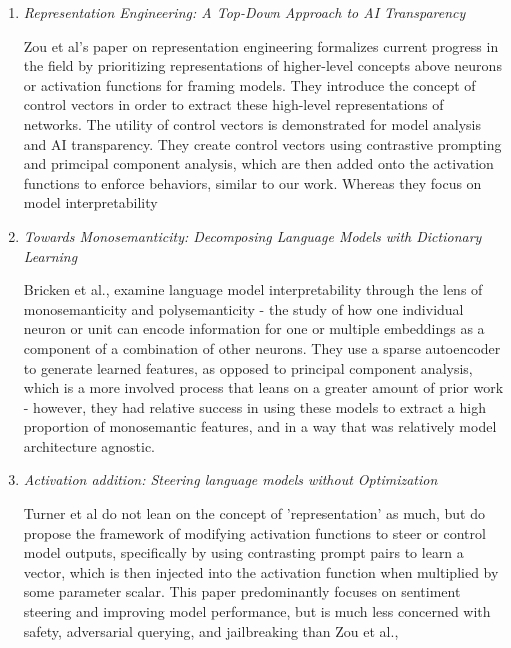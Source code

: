 \documentclass[11pt,a4paper]{article}
\begin{document}
\begin{enumerate}


\item \emph{Representation Engineering: A Top-Down Approach to AI Transparency} ~\cite{zou2023representation}

Zou et al's paper on representation engineering formalizes current progress in the field by prioritizing representations of higher-level concepts above neurons or activation functions for framing models. They introduce the concept of control vectors in order to extract these high-level representations of networks. The utility of control vectors is demonstrated for model analysis and AI transparency. They create control vectors using contrastive prompting and primcipal component analysis, which are then added onto the activation functions to enforce behaviors, similar to our work. Whereas they focus on model interpretability



\item \emph{Towards Monosemanticity: Decomposing Language Models with Dictionary Learning} ~\cite{bricken2023towards}

Bricken et al., examine language model interpretability through the lens of monosemanticity and polysemanticity - the study of how one individual neuron or unit can encode information for one or multiple embeddings as a component of a combination of other neurons. They use a sparse autoencoder to generate learned features, as opposed to principal component analysis, which is a more involved process that leans on a greater amount of prior work - however, they had relative success in using these models to extract a high proportion of monosemantic features, and in a way that was relatively model architecture agnostic.

\item \emph{Activation addition: Steering language models without Optimization}~\cite{turner2023activation}

Turner et al do not lean on the concept of 'representation' as much, but do propose the framework of modifying activation functions to steer or control model outputs, specifically by using contrasting prompt pairs to learn a vector, which is then injected into the activation function when multiplied by some parameter scalar.  This paper predominantly focuses on sentiment steering and improving model performance, but is much less concerned with safety, adversarial querying, and jailbreaking than Zou et al.,


\end{enumerate}
\end{document}
